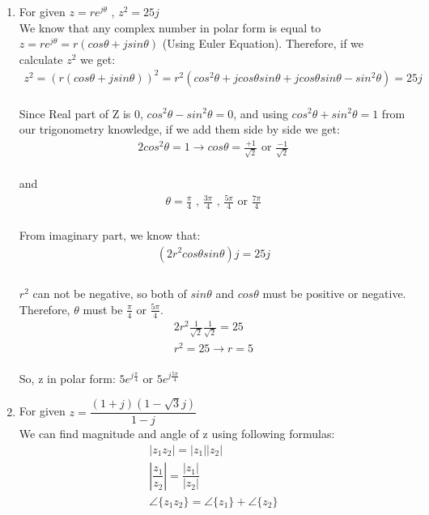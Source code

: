 \documentclass[10pt,a4paper, margin=1in]{article}
\begin{document}
\begin{enumerate}
\begin{enumerate}
    \item For given $z=re^{j\theta}$ , $z^2=25j$ \\
    We know that any complex number in polar form is equal to $z=re^{j\theta}=r(cos\theta+jsin\theta)$ (Using Euler Equation). Therefore, if we calculate $z^2$ we get:
    \begin{gather*}
        z^2 =(r(cos\theta+jsin\theta))^2= r^2(cos^2\theta+jcos\theta sin\theta + jcos\theta sin\theta - sin^2\theta) = 25j
    \end{gather*} \\
    Since Real part of Z is $0$, $cos^2\theta- sin^2\theta = 0$, and using $cos^2\theta + sin^2\theta = 1$ from our trigonometry knowledge, if we add them side by side we get:
    \begin{gather*}
        2cos^2\theta = 1 \rightarrow cos\theta=\frac{+1}{\sqrt{2}}\text{ or } \frac{-1}{\sqrt{2}}
    \end{gather*}\\
    and \begin{gather*}
        \theta = \frac{\pi}{4} \text{ , } \frac{3\pi}{4}
        \text{ , } \frac{5\pi}{4}
        \text{ or } \frac{7\pi}{4}
    \end{gather*}\\
    From imaginary part, we know that:
    \begin{gather*}
        (2r^2cos\theta sin\theta )j= 25j \\
    \end{gather*} \\
    $r^2$ can not be negative, so both of $sin\theta$ and $cos\theta$ must be positive or negative. Therefore, $\theta$ must be $\frac{\pi}{4}$ or $\frac{5\pi}{4}$.
     \begin{gather*}
        2r^2\frac{1}{\sqrt{2}}\frac{1}{\sqrt{2}} = 25 \\
        r^2=25 \rightarrow r=5
    \end{gather*} \\
    So, z in polar form: $5e^{j\frac{\pi}{4}}$ or $5e^{j\frac{5\pi}{4}}$
    \item For given $z=\dfrac{(1+j)(1-\sqrt{3}j)}{1-j}$\\
    We can find magnitude and angle of z using following formulas:
    \begin{gather*}
        |z_1z_2|=|z_1||z_2| \\
        |\dfrac{z_1}{z_2}| = \dfrac{|z_1|}{|z_2|} \\
        \angle \{z_1z_2\}=\angle \{z_1\} + \angle \{z_2\} \\

\end{gather*}
\end{enumerate}
\end{enumerate}
\end{document}
